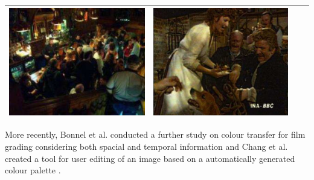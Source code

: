 \begin{longtable}{|N||c|c|c|}
\begin{minipage}{.29\textwidth}
    \includegraphics[width=\textwidth,height=\textheight,keepaspectratio]{images/pitie_target2}
  \end{minipage} & 
  \begin{minipage}{.29\textwidth}
    \includegraphics[width=\textwidth,height=\textheight,keepaspectratio]{images/pitie_result2}
  \end{minipage} \\
    \hline
\end{longtable}

More recently, Bonnel et al. conducted a further study on colour transfer for film grading considering both spacial and temporal information \cite{bonneel_2013_video} and Chang et al. created a tool for user editing of an image based on a automatically generated colour palette \cite{chang_2015_palette}.

